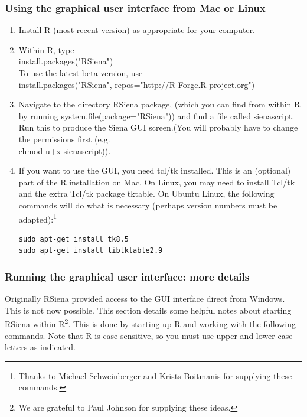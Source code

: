 \documentclass[a4paper,fleqn,11pt]{article}
\newcommand{\+}{\, + \,}
\newcommand{\sfn}[1]{\textsf{#1}}
\newcommand{\R}{{\sf R }}
\newcommand{\Rn}{{\sf R}}
\newcommand{\RS}{{\sf RSiena }}
\begin{document}
\subsubsection{Using the graphical user interface from Mac or Linux}
\begin{enumerate}
\item Install \R (most recent version) as appropriate for your computer.
\item Within \Rn, type\\
  \sfn{install.packages("RSiena")}\\
To use the latest beta version, use\\
 \sfn{install.packages("RSiena", repos="http://R-Forge.R-project.org")}


\item Navigate to the directory RSiena package, (which you can find from within
  R by running \sfn{system.file(package="RSiena")}) and find a file called
  \sfn{sienascript}.  Run this to produce the Siena GUI screen.(You will
  probably have to change the permissions first (e.g.\ \\ \textsf{chmod u+x
    sienascript})).
\item If you want to use the GUI, you need tcl/tk installed. This is an
  (optional) part of the R installation on Mac. On Linux, you may need to
  install Tcl/tk and the extra Tcl/tk package \sfn{tktable}. On
  Ubuntu Linux, the following commands will do what is
  necessary (perhaps version numbers must be adapted):\protect\footnote{Thanks
  to Michael Schweinberger and Krists Boitmanis for supplying these commands.}
\begin{verbatim}
sudo apt-get install tk8.5
sudo apt-get install libtktable2.9
\end{verbatim}
\end{enumerate}

\subsubsection{Running  the graphical user interface: more details}
\label{S_guiinR}

Originally \RS provided access to the GUI interface direct from Windows. This is
not now possible. This section details some helpful notes about starting \RS
within R\protect\footnote{We are
grateful to Paul Johnson for supplying
these ideas.}.
This is done by starting up \R and working with the following commands.
Note that \R is case-sensitive, so you must use upper and lower
case letters as indicated.
\end{document}
